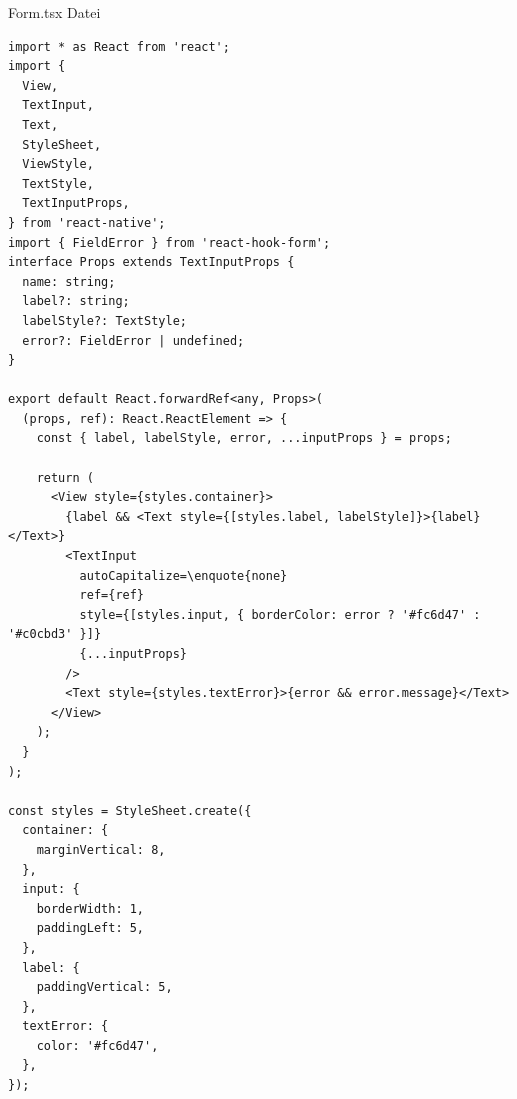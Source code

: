 \documentclass[11pt, twoside]{article}
\begin{document}
\begin{appendix}
\begin{listing}[H]
\caption[Form.tsx]{Form.tsx Datei}
\end{listing}

 




\begin{listing}[H]
	\label{lst:quelltext8}
    \begin{verbatim}
import * as React from 'react';
import {
  View,
  TextInput,
  Text,
  StyleSheet,
  ViewStyle,
  TextStyle,
  TextInputProps,
} from 'react-native';
import { FieldError } from 'react-hook-form';
interface Props extends TextInputProps {
  name: string;
  label?: string;
  labelStyle?: TextStyle;
  error?: FieldError | undefined;
}

export default React.forwardRef<any, Props>(
  (props, ref): React.ReactElement => {
	const { label, labelStyle, error, ...inputProps } = props;

	return (
	  <View style={styles.container}>
		{label && <Text style={[styles.label, labelStyle]}>{label}</Text>}
		<TextInput
		  autoCapitalize=\enquote{none}
		  ref={ref}
		  style={[styles.input, { borderColor: error ? '#fc6d47' : '#c0cbd3' }]}
		  {...inputProps}
		/>
		<Text style={styles.textError}>{error && error.message}</Text>
	  </View>
	);
  }
);

const styles = StyleSheet.create({
  container: {
	marginVertical: 8,
  },
  input: {
	borderWidth: 1,
	paddingLeft: 5,
  },
  label: {
	paddingVertical: 5,
  },
  textError: {
	color: '#fc6d47',
  },
});	
\end{verbatim}



\end{listing}
\end{appendix}
\end{document}
